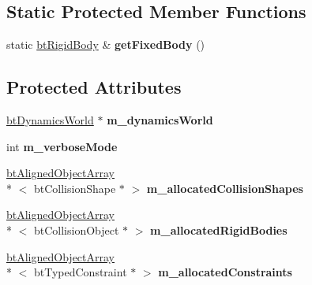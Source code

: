 \subsection*{Static Protected Member Functions}
\begin{DoxyCompactItemize}
\item 
\hypertarget{classbt_world_importer_a064f047ecad3d8fbcfc3ab683f480efa}{static \hyperlink{classbt_rigid_body}{bt\+Rigid\+Body} \& {\bfseries get\+Fixed\+Body} ()}\label{classbt_world_importer_a064f047ecad3d8fbcfc3ab683f480efa}

\end{DoxyCompactItemize}
\subsection*{Protected Attributes}
\begin{DoxyCompactItemize}
\item 
\hypertarget{classbt_world_importer_a83c1bb476d86907a4de90701d839ed60}{\hyperlink{classbt_dynamics_world}{bt\+Dynamics\+World} $\ast$ {\bfseries m\+\_\+dynamics\+World}}\label{classbt_world_importer_a83c1bb476d86907a4de90701d839ed60}

\item 
\hypertarget{classbt_world_importer_a73b50bda0c4af12f71dbaf4f39f5dcef}{int {\bfseries m\+\_\+verbose\+Mode}}\label{classbt_world_importer_a73b50bda0c4af12f71dbaf4f39f5dcef}

\item 
\hypertarget{classbt_world_importer_a95052215bb82881557a46c9c15822ffa}{\hyperlink{classbt_aligned_object_array}{bt\+Aligned\+Object\+Array}\\*
$<$ bt\+Collision\+Shape $\ast$ $>$ {\bfseries m\+\_\+allocated\+Collision\+Shapes}}\label{classbt_world_importer_a95052215bb82881557a46c9c15822ffa}

\item 
\hypertarget{classbt_world_importer_a09871f4016cbc5ff6b60844755ba299c}{\hyperlink{classbt_aligned_object_array}{bt\+Aligned\+Object\+Array}\\*
$<$ bt\+Collision\+Object $\ast$ $>$ {\bfseries m\+\_\+allocated\+Rigid\+Bodies}}\label{classbt_world_importer_a09871f4016cbc5ff6b60844755ba299c}

\item 
\hypertarget{classbt_world_importer_a4bf1734f97ab10200affae3d671552b0}{\hyperlink{classbt_aligned_object_array}{bt\+Aligned\+Object\+Array}\\*
$<$ bt\+Typed\+Constraint $\ast$ $>$ {\bfseries m\+\_\+allocated\+Constraints}}\label{classbt_world_importer_a4bf1734f97ab10200affae3d671552b0}


\end{DoxyCompactItemize}
